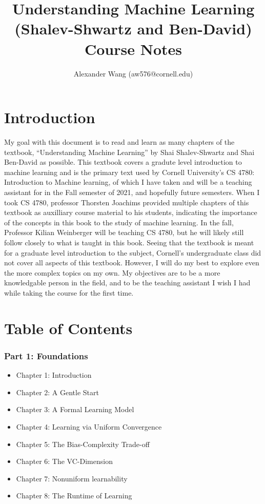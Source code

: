 \message{ !name(understanding_machine_learning.tex)}\documentclass{article}
\title{Understanding Machine Learning (Shalev-Shwartz and Ben-David) \\ \large{Course Notes}}
\author{Alexander Wang (aw576@cornell.edu)}
\begin{document}

\maketitle

\part*{Introduction}

My goal with this document is to read and learn as many chapters of the textbook, ``Understanding Machine Learning'' by Shai Shalev-Shwartz and Shai Ben-David as possible. This textbook covers a gradute level introduction to machine learning and is the primary text used by Cornell University's CS 4780: Introduction to Machine learning, of which I have taken and will be a teaching assistant for in the Fall semester of 2021, and hopefully future semesters. When I took CS 4780, professor Thorsten Joachims provided multiple chapters of this textbook as auxilliary course material to his students, indicating the importance of the concepts in this book to the study of machine learning. In the fall, Professor Kilian Weinberger will be teaching CS 4780, but he will likely still follow closely to what is taught in this book. Seeing that the textbook is meant for a graduate level introduction to the subject, Cornell's undergraduate class did not cover all aspects of this textbook. However, I will do my best to explore even the more complex topics on my own. My objectives are to be a more knowledgable person in the field, and to be the teaching assistant I wish I had while taking the course for the first time.

\part*{Table of Contents}
\section*{Part 1: Foundations}
\begin{itemize}
  \item Chapter 1: Introduction
  \item Chapter 2: A Gentle Start
  \item Chapter 3: A Formal Learning Model
  \item Chapter 4: Learning via Uniform Convergence
  \item Chapter 5: The Bias-Complexity Trade-off
  \item Chapter 6: The VC-Dimension
  \item Chapter 7: Nonuniform learnability
  \item Chapter 8: The Runtime of Learning
\end{itemize}
\end{document}
